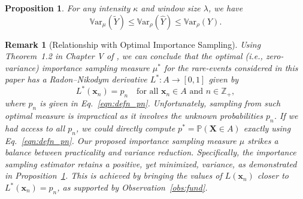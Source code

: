 \documentclass[pdflatex, sn-mathphys-ay]{sn-jnl}%
\newcommand{\intg}{\mathbb{Z}}
\renewcommand{\v}[1]{\boldsymbol{#1}}
\newcommand{\pp}{\mathbb{P}}
\newcommand{\mx}{\v{x}}
\newcommand{\mX}{\v{X}}
\newcommand{\wt}{\widetilde}
\newcommand{\wh}{\widehat}
\newcommand{\var}{\mathbb{V}\mathrm{ar}}
\theoremstyle{thmstyleone}%
\newtheorem{proposition}[theorem]{Proposition}%
\theoremstyle{thmstyletwo}%
\newtheorem{remark}{Remark}%
\theoremstyle{thmstylethree}%
\begin{document}
\begin{proposition}
\label{prop:var_relation}
For any intensity $\kappa$ and window size $\lambda$, we have
\[
\var_\mu(\wt Y) \leq \var_\rho(\wh Y) \leq \var_\rho(Y).
\]
\end{proposition}
\begin{remark}[Relationship with Optimal Importance Sampling]
    Using Theorem~1.2 in Chapter V of \citep{AG07}, we can conclude that the optimal (i.e., zero-variance) importance sampling measure $\mu^*$ for the rare-events considered in this paper has a Radon–Nikodym derivative  $L^*:A\to[0,1]$ given by
    \[
    L^*(\mx_n) = p_n \quad \text{for all}\, \, \mx_n \in A\,\, \text{and}\,\, n \in \intg_+,
    \]
    where $p_n$ is given in Eq.~\eqref{eqn:defn_pn}. 
    Unfortunately, sampling from such optimal measure is impractical as it involves the unknown probabilities  $p_n$. If we had access to all $p_n$, we could directly compute $p^* = \pp(\mX \in A)$ exactly using Eq.~\eqref{eqn:defn_pn}. 
    Our proposed importance sampling measure $\mu$ strikes a balance between practicality and variance reduction.  
    Specifically, the importance sampling estimator retains a positive, yet minimized, variance, as demonstrated in  Proposition~\ref{prop:var_relation}. 
    This is achieved by bringing the values of   $L(\mx_n)$ closer to  $L^*(\mx_n) = p_n$, as supported by Observation~\ref{obs:fund}. 
\end{remark}
\end{document}
